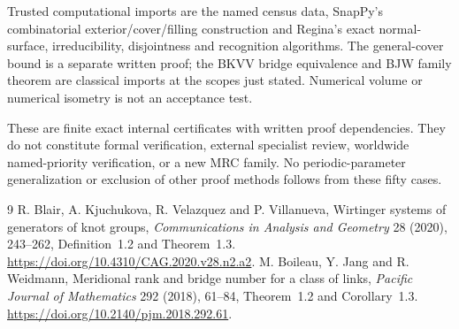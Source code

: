 \documentclass[11pt]{article}
\begin{document}
Trusted computational imports are the named census data, SnapPy's
combinatorial exterior/cover/filling construction and Regina's exact
normal-surface, irreducibility, disjointness and recognition algorithms.
The general-cover bound is a separate written proof; the BKVV
bridge equivalence and BJW family theorem are classical imports at
the scopes just stated. Numerical volume or numerical isometry is
not an acceptance test.

These are finite exact internal certificates with written proof
dependencies. They do not constitute formal verification, external
specialist review, worldwide named-priority verification, or a new
MRC family. No periodic-parameter generalization or exclusion of
other proof methods follows from these fifty cases.

\begin{thebibliography}{9}
R. Blair, A. Kjuchukova, R. Velazquez and P. Villanueva,
Wirtinger systems of generators of knot groups,
\emph{Communications in Analysis and Geometry} 28 (2020), 243--262,
Definition~1.2 and Theorem~1.3.
\url{https://doi.org/10.4310/CAG.2020.v28.n2.a2}.
M. Boileau, Y. Jang and R. Weidmann,
Meridional rank and bridge number for a class of links,
\emph{Pacific Journal of Mathematics} 292 (2018), 61--84,
Theorem~1.2 and Corollary~1.3.
\url{https://doi.org/10.2140/pjm.2018.292.61}.
\end{thebibliography}
\end{document}

